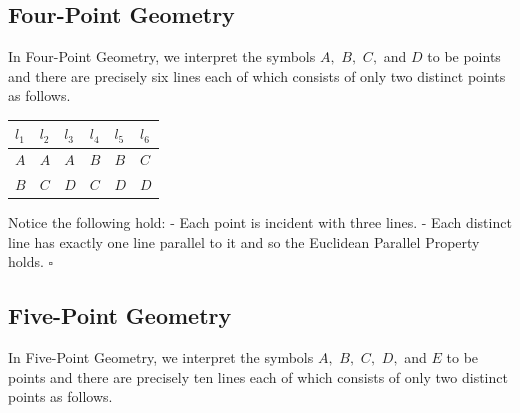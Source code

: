 \documentclass[
  twoside,
  12pt,
  letterpaper,
  fleqn]{article}
\theoremstyle{definition}
\theoremstyle{definition}
\theoremstyle{plain}
\theoremstyle{plain}
\theoremstyle{remark}
\begin{document}
\hypertarget{four-point-geometry}{%
\subsection{Four-Point Geometry}\label{four-point-geometry}}

In Four-Point Geometry, we interpret the symbols \(A,\) \(B,\) \(C,\)
and \(D\) to be points and there are precisely six lines each of which
consists of only two distinct points as follows.

\begin{longtable}[]{@{}llllll@{}}
\toprule()
\(l_1\) & \(l_2\) & \(l_3\) & \(l_4\) & \(l_5\) & \(l_6\) \\
\midrule()
\endhead
\(A\) & \(A\) & \(A\) & \(B\) & \(B\) & \(C\) \\
\(B\) & \(C\) & \(D\) & \(C\) & \(D\) & \(D\) \\
\bottomrule()
\end{longtable}

Notice the following hold: - Each point is incident with three lines. -
Each distinct line has exactly one line parallel to it and so the
Euclidean Parallel Property holds. \(\square\)

\hypertarget{five-point-geometry}{%
\subsection{Five-Point Geometry}\label{five-point-geometry}}

In Five-Point Geometry, we interpret the symbols \(A,\) \(B,\) \(C,\)
\(D,\) and \(E\) to be points and there are precisely ten lines each of
which consists of only two distinct points as follows.
\end{document}
